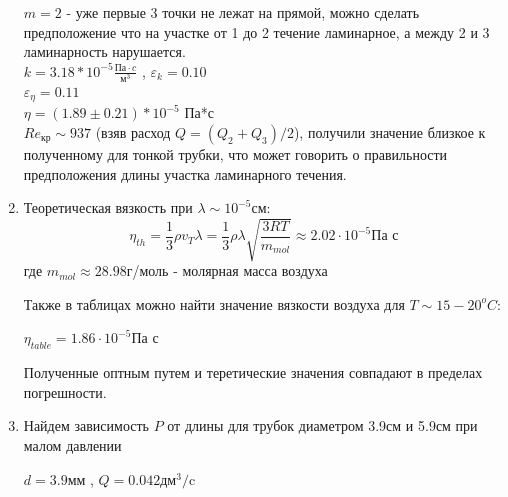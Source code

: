 \documentclass[10pt]{article}
\begin{document}
\begin{enumerate}
        \indent $m = 2$ - уже первые 3 точки не лежат на прямой, можно сделать предположение что на участке от 1 до 2 течение ламинарное, а между 2 и 3 ламинарность нарушается. \\
        \indent $k = 3.18 * 10^{-5} \frac{\text{Па}\cdot c}{\text{м}^3}$ , $\varepsilon_k = 0.10$ \\
        \indent $\varepsilon_{\eta} =  0.11$ \\
        \indent $\eta = (1.89 \pm 0.21) * 10^{-5}$ Па*с \\
        \indent $Re_{\text{кр}} \sim  937$  (взяв расход $Q = (Q_2 + Q_3)/2$), получили значение близкое к полученному для тонкой трубки, что может говорить о правильности предположения длины участка ламинарного течения.
     
     \item Теоретическая вязкость при $\lambda \sim 10^{-5}$см: 
        \begin{equation}
                \eta_{th} = \frac{1}{3} \rho v_T \lambda = \frac{1}{3} \rho \lambda \sqrt{\frac{3RT}{m_{mol}}} \approx  2.02 \cdot 10^{-5} \text{Па с}
        \end{equation}
        где $m_{mol} \approx 28.98$г/моль - молярная масса воздуха
        
    Также в таблицах можно найти значение вязкости воздуха для $T \sim 15 - 20^o C:$

    $\eta_{table} = 1.86 \cdot 10^{-5} \text{Па с}$

    Полученные оптным путем и теретические значения совпадают в пределах погрешности. 
     
     \pagebreak
    \item Найдем зависимость $P$ от длины для трубок диаметром 3.9см и 5.9см при малом давлении
                    \begin{center}
                    $d = 3.9$мм , $Q = 0.042 \text{дм}^3/\text{c}$


\end{center}
\end{enumerate}
\end{document}
